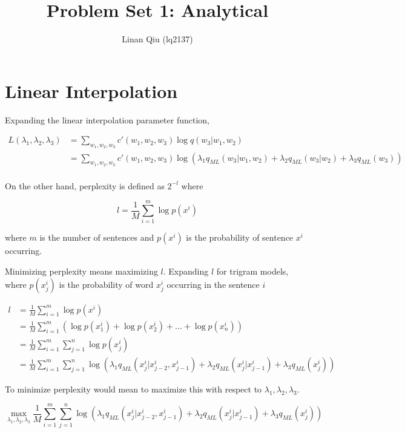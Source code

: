 \documentclass[11pt]{scrartcl}
\title{Problem Set 1: Analytical}
\author{Linan Qiu (lq2137)}
\begin{document}
\maketitle

\section{Linear Interpolation}

Expanding the linear interpolation parameter function,

\begin{align*}
L(\lambda_1, \lambda_2, \lambda_3) &= \sum_{w_1, w_2, w_3} c'(w_1, w_2, w_3)\log q(w_3 | w_1, w_2) \\
&= \sum_{w_1, w_2, w_3} c'(w_1, w_2, w_3)  \log \left( \lambda_1 q_{ML} (w_3| w_1, w_2) + \lambda_2 q_{ML} (w_3 | w_2) + \lambda_3 q_{ML} (w_3) \right) \\
\end{align*}

On the other hand, perplexity is defined as $2^{-l}$ where 

\[ l = \frac{1}{M} \sum^{m}_{i=1} \log p(x^i) \]

where $m$ is the number of sentences and $p(x^i)$ is the probability of sentence $x^i$ occurring. 

Minimizing perplexity means maximizing $l$. Expanding $l$ for trigram models, where $p(x_j^i)$ is the probability of word $x_j^i$ occurring in the sentence $i$

\begin{align*}
l &= \frac{1}{M} \sum^{m}_{i=1} \log p(x^i) \\
&= \frac{1}{M} \sum^{m}_{i=1} \left( \log p(x_1^i) + \log p(x_2^i) + ... + \log p(x_n^i) \right) \\
&= \frac{1}{M} \sum^m_{i=1} \sum^n_{j=1} \log p(x_j^i) \\
&= \frac{1}{M} \sum^m_{i=1} \sum^n_{j=1} \log \left( \lambda_1 q_{ML} (x^i_j| x^i_{j-2}, x^i_{j-1}) + \lambda_2 q_{ML} (x^i_j | x^i_{j-1}) + \lambda_3 q_{ML} (x^i_j) \right)
\end{align*}

To minimize perplexity would mean to maximize this with respect to $\lambda_1, \lambda_2, \lambda_3$.

\[ \max_{\lambda_1, \lambda_2, \lambda_3} \frac{1}{M} \sum^m_{i=1} \sum^n_{j=1} \log \left( \lambda_1 q_{ML} (x^i_j| x^i_{j-2}, x^i_{j-1}) + \lambda_2 q_{ML} (x^i_j | x^i_{j-1}) + \lambda_3 q_{ML} (x^i_j) \right) \]
\end{document}
